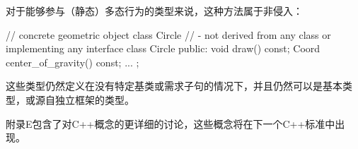 对于能够参与（静态）多态行为的类型来说，这种方法属于非侵入：

\begin{cpp}
// concrete geometric object class Circle
// - not derived from any class or implementing any interface
class Circle {
	public:
	void draw() const;
	Coord center_of_gravity() const;
	...
};
\end{cpp}

这些类型仍然定义在没有特定基类或需求子句的情况下，并且仍然可以是基本类型，或源自独立框架的类型。

附录E包含了对C++概念的更详细的讨论，这些概念将在下一个C++标准中出现。



















